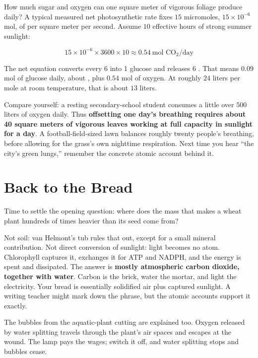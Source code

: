 \begin{qiaoliang}
How much sugar and oxygen can one square meter of vigorous foliage produce daily? A typical measured net photosynthetic rate fixes $15$ micromoles, $15\times 10^{-6}$ mol, of  per square meter per second. Assume $10$ effective hours of strong summer sunlight:

\[
15\times 10^{-6} \times 3600 \times 10 \approx 0.54\ \text{mol CO}_2/\text{day}
\]

The net equation converts every 6  into 1 glucose and releases 6 . That means $0.09$ mol of glucose daily, about , plus $0.54$ mol of oxygen. At roughly $24$ liters per mole at room temperature, that is about $13$ liters.

Compare yourself: a resting secondary-school student consumes a little over $500$ liters of oxygen daily. Thus \textbf{offsetting one day's breathing requires about 40 square meters of vigorous leaves working at full capacity in sunlight for a day}. A football-field-sized lawn balances roughly twenty people's breathing, before allowing for the grass's own nighttime respiration. Next time you hear ``the city's green lungs,'' remember the concrete atomic account behind it.
\end{qiaoliang}

\section{Back to the Bread}

Time to settle the opening question: where does the mass that makes a wheat plant hundreds of times heavier than its seed come from?

Not soil: van Helmont's tub rules that out, except for a small mineral contribution. Not direct conversion of sunlight: light becomes no atom. Chlorophyll captures it, exchanges it for ATP and NADPH, and the energy is spent and dissipated. The answer is \textbf{mostly atmospheric carbon dioxide, together with water}. Carbon is the brick, water the mortar, and light the electricity. Your bread is essentially solidified air plus captured sunlight. A writing teacher might mark down the phrase, but the atomic accounts support it exactly.

The bubbles from the aquatic-plant cutting are explained too. Oxygen released by water splitting travels through the plant's air spaces and escapes at the wound. The lamp pays the wages; switch it off, and water splitting stops and bubbles cease.


